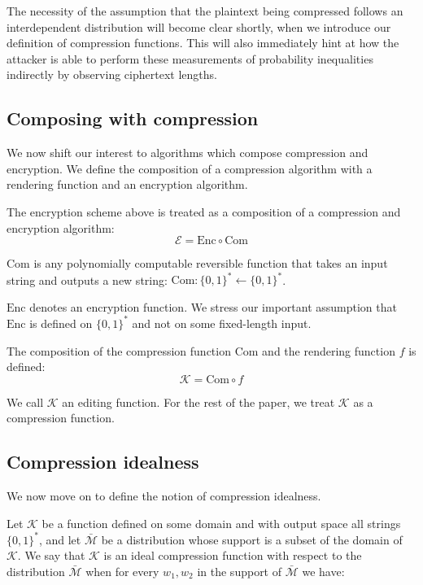 The necessity of the assumption that the plaintext being compressed follows an
interdependent distribution will become clear shortly, when we introduce our
definition of compression functions. This will also immediately hint at how the
attacker is able to perform these measurements of probability inequalities
indirectly by observing ciphertext lengths.

\subsection{Composing with compression}\label{subsec:comcompose}

We now shift our interest to algorithms which compose compression and
encryption. We define the composition of a compression algorithm with a
rendering function and an encryption algorithm.

The encryption scheme above is treated as a composition of a
compression and encryption algorithm:
\begin{equation*}
    \mathcal{E} = \textrm{Enc} \circ \textrm{Com}
\end{equation*}

$\textrm{Com}$ is any polynomially computable reversible function that takes an
input string and outputs a new string: $\textrm{Com}: \{0, 1\}^* \leftarrow \{0,
1\}^*$.

$\textrm{Enc}$ denotes an encryption function. We stress our important
assumption that $\textrm{Enc}$ is defined on $\{0, 1\}^*$ and not on some
fixed-length input.

The composition of the compression function $\textrm{Com}$ and the rendering function $f$
is defined:
\begin{equation*}
    \mathcal{K} = \textrm{Com} \circ f
\end{equation*}

We call $\mathcal{K}$ an editing function. For the rest of the paper, we treat
$\mathcal{K}$ as a compression function.

\subsection{Compression idealness}\label{subsec:com_idealness}

We now move on to define the notion of compression idealness.

Let $\mathcal{K}$ be a function defined on some domain and with output space
all strings $\{0, 1\}^*$, and let $\bar{\mathcal{M}}$ be a distribution whose
support is a subset of the domain of $\mathcal{K}$.  We say that $\mathcal{K}$
is an ideal compression function with respect to the distribution
$\bar{\mathcal{M}}$ when for every $w_1, w_2$ in the support of
$\bar{\mathcal{M}}$ we have:

